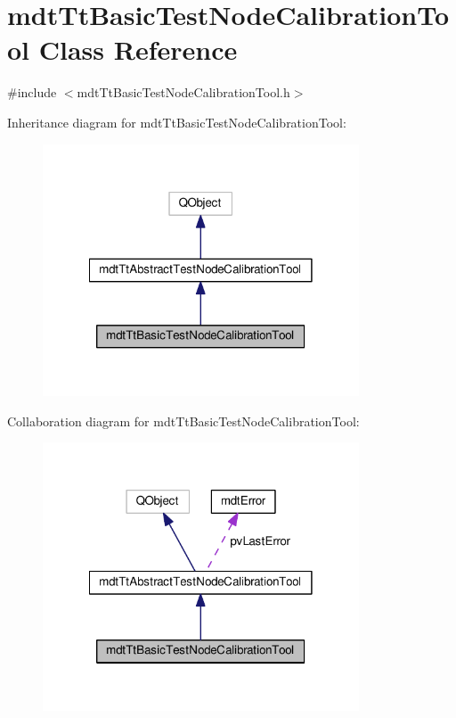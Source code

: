 \hypertarget{classmdt_tt_basic_test_node_calibration_tool}{\section{mdt\-Tt\-Basic\-Test\-Node\-Calibration\-Tool Class Reference}
\label{classmdt_tt_basic_test_node_calibration_tool}
}


{\ttfamily \#include $<$mdt\-Tt\-Basic\-Test\-Node\-Calibration\-Tool.\-h$>$}



Inheritance diagram for mdt\-Tt\-Basic\-Test\-Node\-Calibration\-Tool\-:
\nopagebreak
\begin{figure}[H]
\begin{center}
\leavevmode
\includegraphics[width=266pt]{classmdt_tt_basic_test_node_calibration_tool__inherit__graph}
\end{center}
\end{figure}


Collaboration diagram for mdt\-Tt\-Basic\-Test\-Node\-Calibration\-Tool\-:
\nopagebreak
\begin{figure}[H]
\begin{center}
\leavevmode
\includegraphics[width=266pt]{classmdt_tt_basic_test_node_calibration_tool__coll__graph}
\end{center}
\end{figure}
